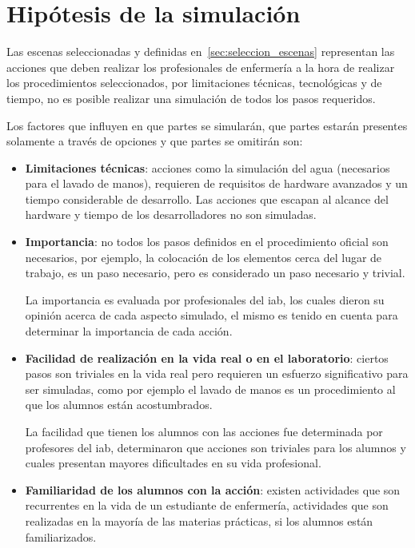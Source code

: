\section{Hipótesis de la simulación}
\label{sec:hipotesis}

Las escenas seleccionadas y definidas en~\ref{sec:seleccion_escenas} representan
las acciones que deben realizar los profesionales de enfermería a la hora de
realizar los procedimientos seleccionados, por limitaciones técnicas,
tecnológicas y de tiempo, no es posible realizar una simulación de todos los
pasos requeridos.

Los factores que influyen en que partes se simularán, que partes estarán
presentes solamente a través de opciones y que partes se omitirán son:

\begin{itemize}

    \item \textbf{Limitaciones técnicas}: acciones como la simulación del agua
        (necesarios para el lavado de manos), requieren de requisitos de
        hardware avanzados y un tiempo considerable de desarrollo. Las acciones
        que escapan al alcance del hardware y tiempo de los desarrolladores no
        son simuladas.

    \item \textbf{Importancia}: no todos los pasos definidos en el procedimiento
        oficial son necesarios, por ejemplo, la colocación de los elementos
        cerca del lugar de trabajo, es un paso necesario, pero es considerado un
        paso necesario y trivial.

        La importancia es evaluada por profesionales del \Gls{iab}, los cuales
        dieron su opinión acerca de cada aspecto simulado, el mismo es tenido en
        cuenta para determinar la importancia de cada acción.

    \item \textbf{Facilidad de realización en la vida real o en el laboratorio}:
        ciertos pasos son triviales en la vida real pero requieren un esfuerzo
        significativo para ser simuladas, como por ejemplo el lavado de manos es
        un procedimiento al que los alumnos están acostumbrados.

        La facilidad que tienen los alumnos con las acciones fue determinada por
        profesores del \Gls{iab}, determinaron que acciones son triviales para
        los alumnos y cuales presentan mayores dificultades en su vida
        profesional.

    \item \textbf{Familiaridad de los alumnos con la acción}: existen
        actividades que son recurrentes en la vida de un estudiante de
        enfermería, actividades que son realizadas en la mayoría de las
        materias prácticas, si los alumnos están familiarizados.

\end{itemize}

